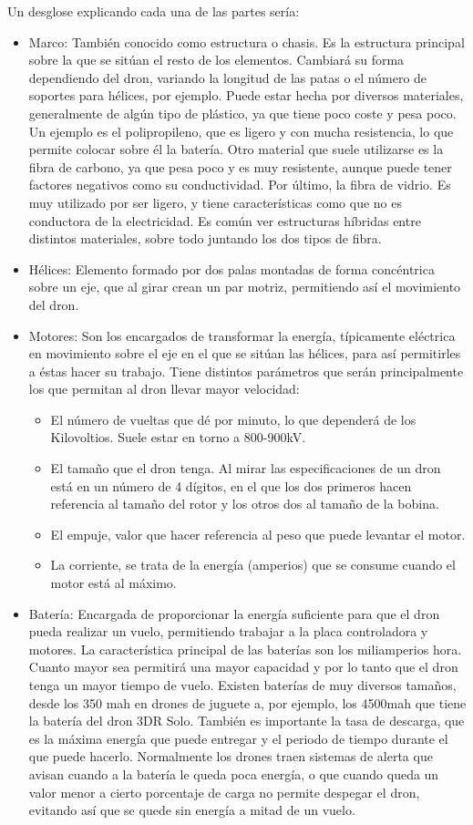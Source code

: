 Un desglose explicando cada una de las partes sería:
\begin{itemize}
\item Marco: También conocido como estructura o chasis. Es la estructura principal sobre la que se sitúan el resto de los elementos. Cambiará su forma dependiendo del dron, variando la longitud de las patas o el número de soportes para hélices, por ejemplo. Puede estar hecha por diversos materiales, generalmente de algún tipo de plástico, ya que tiene poco coste y pesa poco. Un ejemplo es el polipropileno, que es ligero y con mucha resistencia, lo que permite colocar sobre él la batería. Otro material que suele utilizarse es la fibra de carbono, ya que pesa poco y es muy resistente, aunque puede tener factores negativos como su conductividad. Por último, la fibra de vidrio. Es muy utilizado por ser ligero, y tiene características como que no es conductora de la electricidad. Es común ver estructuras híbridas entre distintos materiales, sobre todo juntando los dos tipos de fibra.
\item Hélices: Elemento formado por dos palas montadas de forma concéntrica sobre un eje, que al girar crean un par motriz, permitiendo así el movimiento del dron.
\item Motores: Son los encargados de transformar la energía, típicamente eléctrica en movimiento sobre el eje en el que se sitúan las hélices, para así permitirles a éstas hacer su trabajo. Tiene distintos parámetros que serán principalmente los que permitan al dron llevar mayor velocidad:
	\begin{itemize}
	\item El número de vueltas que dé por minuto, lo que dependerá de los Kilovoltios. Suele estar en torno a 800-900kV.
	\item El tamaño que el dron tenga. Al mirar las especificaciones de un dron está en un número de 4 dígitos, en el que los dos primeros hacen referencia al tamaño del rotor y los otros dos al tamaño de la bobina. 
    \item El empuje, valor que hacer referencia al peso que puede levantar el motor.
	\item La corriente, se trata de la energía (amperios) que se consume cuando el motor
está al máximo.
	\end{itemize}
\item Batería: Encargada de proporcionar la energía suficiente para que el dron pueda realizar un vuelo, permitiendo trabajar a la placa controladora y motores. La característica principal de las baterías son los miliamperios hora. Cuanto mayor sea permitirá una mayor capacidad y por lo tanto que el dron tenga un mayor tiempo de vuelo. Existen baterías de muy diversos tamaños, desde los 350 mah en drones de juguete a, por ejemplo, los 4500mah que tiene la batería del dron 3DR Solo. También es importante la tasa de descarga, que es la máxima energía que puede entregar y el periodo de tiempo durante el que puede hacerlo. Normalmente los drones traen sistemas de alerta que avisan cuando a la batería le queda poca energía, o que cuando queda un valor menor a cierto porcentaje de carga no permite despegar el dron, evitando así que se quede sin energía a mitad de un vuelo.

\end{itemize}
